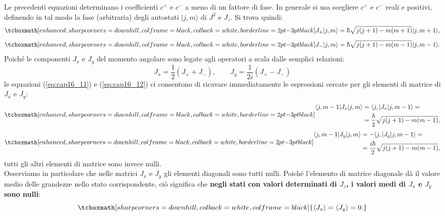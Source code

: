 \documentclass[a4paper,12pt,oneside]{book}
\begin{document}
Le precedenti equazioni determinano i coefficienti $c^+$ e $c^-$ a meno di un fattore di fase. In generale si usa scegliere $c^+$ e $c^-$ reali e positivi, definendo in tal modo la fase (arbitraria) degli autostati $\vert j,m \rangle$ di $J^2$ e $J_z$. Si trova quindi:
	\begin{equation}
		\tcboxmath[enhanced, sharp corners=downhill, colframe=black, colback=white, borderline={2pt}{-3pt}{black}]{
 			J_+\vert j, m \rangle =\hbar \sqrt{j(j+1)-m(m+1)}\vert j, m+1 \rangle ,
 			}
	\label{eq:cap16_11}
	\end{equation}
	\begin{equation}
		\tcboxmath[enhanced, sharp corners=downhill, colframe=black, colback=white, borderline={2pt}{-3pt}{black}]{
			J_-\vert j, m \rangle =\hbar \sqrt{j(j+1)-m(m-1)}\vert j, m-1 \rangle  .
			}
	\label{eq:cap16_12}
	\end{equation}
Poiché le componenti $J_x$ e $J_y$ del momento angolare sono legate agli operatori a scala dalle semplici relazioni:
\begin{equation}
J_x= \frac{1}{2}\left(J_+ + J_-\right),\qquad J_y= \frac{1}{2i}\left(J_+ - J_-\right)
\end{equation}
le equazioni (\ref{eq:cap16_11}) e (\ref{eq:cap16_12}) ci consentono di ricavare immediatamente le espressioni cercate per gli elementi di matrice di $J_x$ e $J_y$:
	\begin{equation}
		\tcboxmath[enhanced, sharp corners=downhill, colframe=black, colback=white, borderline={2pt}{-3pt}{black}]{
		\begin{aligned}
			\langle j, m-1\vert J_x\vert j, m \rangle &=\langle j, \vert J_x\vert j, m-1 \rangle =   \\
			&= \frac{\hbar}{2}\sqrt{j(j+1)-m(m-1)} , 
		\end{aligned}
		}
	\end{equation}
	\begin{equation}
		\tcboxmath[enhanced, sharp corners=downhill, colframe=black, colback=white, borderline={2pt}{-3pt}{black}]{
		\begin{aligned}
			\langle j, m-1\vert J_y\vert j, m \rangle &= -\langle j, \vert J_y\vert j, m-1 \rangle =  \\
			&= \frac{i\hbar}{2}\sqrt{j(j+1)-m(m-1)} , 
		\end{aligned}
		}
	\end{equation}
tutti gli altri elementi di matrice sono invece nulli.\\

Osserviamo in particolare che nelle matrici $J_x$ e $J_y$ gli elementi diagonali sono tutti nulli. Poiché l'elemento di matrice diagonale dà il valore medio delle grandezze nello stato corrispondente, ciò significa che \textbf{negli stati con valori determinati di $J_z$, i valori medi di $J_x$ e $J_y$ sono nulli}:
	\begin{equation}
		\tcboxmath[sharp corners=downhill, colback=white, colframe=black]{
			\langle J_x \rangle = \langle J_y \rangle =0.
		}
	\end{equation}
\end{document}

